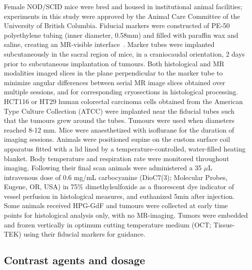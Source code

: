 Female NOD/SCID mice were bred and housed in institutional animal facilities; experiments in this study were approved by the Animal Care Committee of the University of British Columbia.
Fiducial markers were constructed of PE-50 polyethylene tubing (inner diameter, 0.58mm) and filled with paraffin wax and saline, creating an MR-visible interface~\cite{Bains:2009hh}.
Marker tubes were implanted subcutaneously in the sacral region of mice, in a craniocaudal orientation, 2 days prior to subcutaneous implantation of tumours.
Both histological and MR modalities imaged slices in the plane perpendicular to the marker tube to minimize angular differences between serial MR image slices obtained over multiple sessions, and for corresponding cryosections in histological processing.
HCT116 or HT29 human colorectal carcinoma cells obtained from the American Type Culture Collection (ATCC) were implanted near the fiducial tubes such that the tumours grew around the tubes.
Tumours were used when diameters reached 8-12 mm.
Mice were anaesthetized with isoflurane for the duration of imaging sessions.
Animals were positioned supine on the custom surface coil apparatus fitted with a lid lined by a temperature-controlled, water-filled heating blanket.
Body temperature and respiration rate were monitored throughout imaging.
Following their final scan animals were administered a 35 $\mu$L intravenous dose of 0.6 mg/mL carbocyanine (DioC7(3); Molecular Probes, Eugene, OR, USA) in 75\% dimethylsulfoxide as a fluorescent dye indicator of vessel perfusion in histological measures, and euthanized 5min after injection.
Some animals received \ac{HPG-GdF} and tumours were collected at early time points for histological analysis only, with no MR-imaging.
Tumors were embedded and frozen vertically in optimum cutting temperature medium (OCT; Tissue-TEK) using their fiducial markers for guidance.

\subsection{Contrast agents and dosage}

